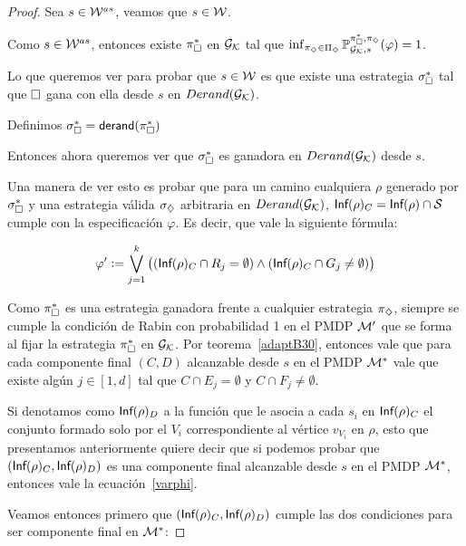 \begin{proof}
	Sea $s \in \mathcal{W}^{as}$, veamos que $s \in \mathcal{W}$.

	Como $s \in \mathcal{W}^{as}$, entonces existe $\pi_\square^*$ en $\mathcal{G}_{\mathcal{K}}$ tal que
	$\inf_{\pi_\diamondsuit \in \Pi_\diamondsuit}\mathbb{P}_{\mathcal{G}_{\mathcal{K}},s}^{\pi_\square^*, \pi_\diamondsuit}(\varphi) = 1$.

	Lo que queremos ver para probar que $s \in \mathcal{W}$ es que existe una estrategia
	$\sigma_\square^*$ tal que $\square$ gana con ella desde $s$ en $Derand(\mathcal{G}_{\mathcal{K}})$.

	Definimos $\sigma_\square^* = \textsf{derand}(\pi_\square^*)$

	Entonces ahora queremos ver que $\sigma_\square^*$ es ganadora en $Derand(\mathcal{G}_{\mathcal{K}})$ desde
	$s$.

	Una manera de ver esto es probar que para un camino cualquiera $\rho$ generado
	por $\sigma_\square^*$ y una estrategia válida $\sigma_\diamondsuit$ arbitraria en
	$Derand(\mathcal{G}_{\mathcal{K}})$, $\textsf{Inf}(\rho)_C = \textsf{Inf}(\rho) \cap \mathcal{S}$ cumple con la especificación
	$\varphi$. Es decir, que vale la siguiente fórmula:

	\begin{equation}
		\label{varphi}
		\varphi' := \bigvee_{j = 1}^{k} \left((\textsf{Inf}(\rho)_C \cap R_j = \emptyset) \wedge (\textsf{Inf}(\rho)_C \cap G_j \neq \emptyset)  \right)
	\end{equation}

	Como $\pi_\square^*$ es una estrategia ganadora frente a cualquier estrategia
	$\pi_\diamondsuit$, siempre se cumple la condición de Rabin con probabilidad 1 en el
	PMDP $\mathcal{M}'$ que se forma al fijar la estrategia $\pi_\square^*$ en $\mathcal{G}_{\mathcal{K}}$. Por
	teorema~\ref{adaptB30}, entonces vale que para cada componente final $(C,D)$
	alcanzable desde $s$ en el PMDP $\mathcal{M}^*$ vale que existe algún $j \in [1,d]$ tal
	que $C \cap E_j = \emptyset$ y $C \cap F_j \neq \emptyset$.

	Si denotamos como $\textsf{Inf}(\rho)_D$ a la función que le asocia a cada $s_i$ en
	$\textsf{Inf}(\rho)_C$ el conjunto formado solo por el $V_i$ correspondiente al vértice
	$v_{V_i}$ en $\rho$, esto que presentamos anteriormente quiere decir que si
	podemos probar que $(\textsf{Inf}(\rho)_C, \textsf{Inf}(\rho)_D)$ es una componente final
	alcanzable desde $s$ en el PMDP $\mathcal{M}^*$, entonces vale la ecuación~\ref{varphi}.


	Veamos entonces primero que $(\textsf{Inf}(\rho)_C, \textsf{Inf}(\rho)_D)$ cumple las dos
	condiciones para ser componente final en $\mathcal{M}^*$:



\end{proof}
